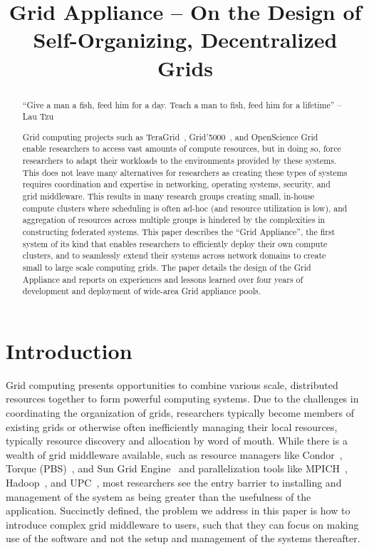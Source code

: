 \documentclass[conference]{IEEEtran}
\begin{document}
\title{Grid Appliance -- On the Design of Self-Organizing,
Decentralized Grids}

\author{
}

\maketitle


\begin{abstract}

``Give a man a fish, feed him for a day.  Teach a man to fish, feed him for a
lifetime'' -- Lau Tzu

Grid computing projects such as TeraGrid~\cite{teragrid},
Grid'5000~\cite{grid_5000}, and OpenScience Grid~\cite{osg} enable researchers
to access vast amounts of compute resources, but in doing so, force researchers
to adapt their workloads to the environments provided by these systems.  This
does not leave many alternatives for researchers as creating these types of
systems requires coordination and expertise in networking, operating systems,
security, and grid middleware.  This results in many research groups creating
small, in-house compute clusters where scheduling is often ad-hoc (and resource
utilization is low), and aggregation of resources across multiple groups is
hindered by the complexities in constructing federated systems.  This paper
describes the ``Grid Appliance'', the first system of its kind that enables
researchers to efficiently deploy their own compute clusters, and to seamlessly
extend their systems across network domains to create small to large scale
computing grids.  The paper details the design of the Grid Appliance and
reports on experiences and lessons learned over four years of development and
deployment of wide-area Grid appliance pools.

\end{abstract}

\section{Introduction}

Grid computing presents opportunities to combine various scale, distributed
resources together to form powerful computing systems.  Due to the challenges
in coordinating the organization of grids, researchers typically become members
of existing grids or otherwise often inefficiently managing their local
resources, typically resource discovery and allocation by word of mouth.  While
there is a wealth of grid middleware available, such as resource managers like
Condor~\cite{condor0}, Torque (PBS)~\cite{torque}, and Sun Grid
Engine~\cite{grid_engine} and parallelization tools like MPICH~\cite{mpich},
Hadoop~\cite{hadoop}, and UPC~\cite{upc}, most researchers see the entry
barrier to installing and management of the system as being greater than the
usefulness of the application.  Succinctly defined, the problem we address in
this paper is how to introduce complex grid middleware to users, such that they
can focus on making use of the software and not the setup and management of the
systems thereafter.
\end{document}
